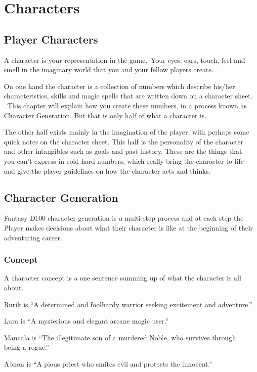 \chapter{Characters}
\label{ch:characters}

\section{Player Characters}
A character is your representation in the game. Your eyes, ears, touch, feel and smell in the imaginary world that you and your fellow players create.

On one hand the character is a collection of numbers which describe his/her characteristics, skills and magic spells that are written down on a character sheet.  This chapter will explain how you create these numbers, in a process known as Character Generation. But that is only half of what a character is.

The other half exists mainly in the imagination of the player, with perhaps some quick notes on the character sheet. This half is the personality of the character and other intangibles such as goals and past history. These are the things that you can’t express in cold hard numbers, which really bring the character to life and give the player guidelines on how the character acts and thinks.


\section{Character Generation}
Fantasy D100 character generation is a multi-step process and at each step the Player makes decisions about what their character is like at the beginning of their adventuring career. 

\subsection{Concept}
A character concept is a one sentence summing up of what the character is all about.

\begin{rpg-examplebox}
\begin{rpg-list}
\item Rurik is ``A determined and foolhardy warrior seeking excitement and adventure.''
\item Lura is ``A mysterious and elegant arcane magic user.''
\item Mancala is ``The illegitimate son of a murdered Noble, who survives through being a rogue.''
\item Abnon is ``A pious priest who smites evil and protects the innocent.''
\end{rpg-list}
\end{rpg-examplebox}

